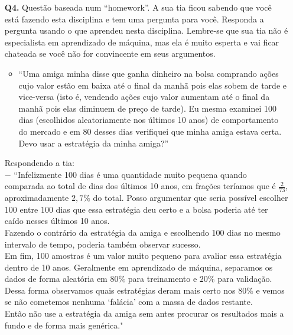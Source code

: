 \documentclass[12pt]{article}
\begin{document}
\begin{enumerate}
\item [\textbf{Q4.}] Questão baseada num ``homework''. A sua tia ficou sabendo que você está fazendo esta disciplina e tem uma pergunta para você. Responda a pergunta usando o que aprendeu nesta disciplina. Lembre-se que sua tia não é especialista em aprendizado de
  máquina, mas ela é muito esperta e vai ficar chateada se você não for convincente em seus argumentos.
	\begin{itemize}
		\item ``Uma amiga minha disse que ganha dinheiro na bolsa comprando ações cujo valor estão em baixa até o final da manhã pois elas sobem de tarde e vice-versa (isto é, vendendo ações cujo valor aumentam até o final da manhã pois elas diminuem de preço de tarde). Eu mesma examinei 100 dias (escolhidos aleatoriamente nos últimos 10 anos) de
  comportamento do mercado e em 80 desses dias verifiquei que minha amiga estava certa. Devo usar a estratégia da minha amiga?''
	\end{itemize}
	\begin{addmargin}[1em]{2em}%
		Respondendo a tia:\\
			\quad $-$ ``Infelizmente 100 dias é uma quantidade muito pequena quando comparada ao total de dias dos últimos 10 anos, em frações teríamos que é $\frac{2}{73}$, aproximadamente $2,7\%$ do total. Posso argumentar que seria possível escolher 100 entre 100 dias que essa estratégia deu certo e a bolsa poderia até ter caído nesses últimos 10 anos.\\
			Fazendo o contrário da estratégia da amiga e escolhendo 100 dias no mesmo intervalo de tempo, poderia também observar sucesso.\\
			Em fim, 100 amostras é um valor muito pequeno para avaliar essa estratégia dentro de 10 anos. Geralmente em aprendizado de máquina, separamos os dados de forma aleatória em $80\%$ para treinamento e $20\%$ para validação. Dessa forma observamos quais estratégias deram mais certo nos $80\%$ e vemos se não cometemos nenhuma `falácia' com a massa de dados restante.\\
			Então não use a estratégia da amiga sem antes procurar os resultados mais a fundo e de forma mais genérica."
	\end{addmargin}


\end{enumerate}
\end{document}
